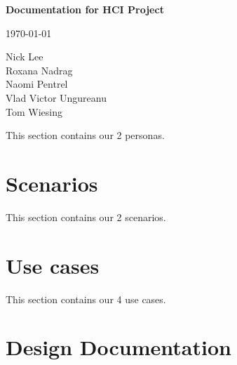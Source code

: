 \documentclass[12pt]{article}
\begin{document}
\begin{titlepage}

\begin{center}
{\huge {\bfseries Documentation for HCI Project}\\[1cm]}

{\large{\today} \\[0.5cm]}


Nick Lee\\
Roxana Nadrag\\
Naomi Pentrel\\
Vlad Victor Ungureanu\\
Tom Wiesing

\end{center}
\end{titlepage}

\tableofcontents

\newpage
This section contains our 2 personas.




\newpage

\section{Scenarios}

This section contains our 2 scenarios.




\newpage

\section{Use cases}

This section contains our 4 use cases.






\newpage

\section{Design Documentation}
\end{document}
